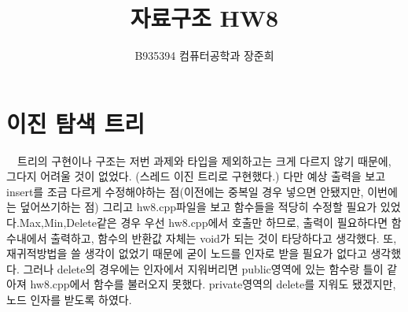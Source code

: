 \documentclass[a4paper,11pt]{article}
\begin{document}
\title{자료구조 HW8}
\author{B935394 컴퓨터공학과 장준희}
\maketitle
\newpage
\section{이진 탐색 트리}
\  \ 트리의 구현이나 구조는 저번 과제와 타입을 제외하고는 크게 다르지 않기 때문에, 그다지 어려울 것이 없었다. (스레드 이진 트리로 구현했다.) 다만 예상 출력을 보고 insert를 조금 다르게 수정해야하는 점(이전에는 중복일 경우 넣으면 안됐지만, 이번에는 덮어쓰기하는 점) 그리고 hw8.cpp파일을 보고 함수들을 적당히 수정할 필요가 있었다.Max,Min,Delete같은 경우 우선 hw8.cpp에서 호출만 하므로, 출력이 필요하다면 함수내에서 출력하고, 함수의 반환값 자체는 void가 되는 것이 타당하다고 생각했다. 또, 재귀적방법을 쓸 생각이 없었기 때문에 굳이 노드를 인자로 받을 필요가 없다고 생각했다. 그러나 delete의 경우에는 인자에서 지워버리면 public영역에 있는 함수랑 틀이 같아져 hw8.cpp에서 함수를 불러오지 못했다. private영역의 delete를 지워도 됐겠지만, 노드 인자를 받도록 하였다.
\end{document}
